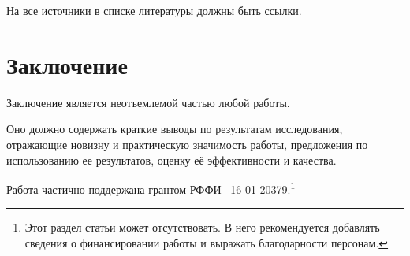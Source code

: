\documentclass[60x84/16,8pt]{ittmm}
\begin{document}
На все источники в списке литературы должны быть ссылки.

\section{Заключение}

Заключение является неотъемлемой частью любой работы. 

Оно должно содержать краткие выводы по результатам исследования,
отражающие новизну и практическую значимость работы, предложения по
использованию ее результатов, оценку её эффективности и качества.


\begin{acknowledgments}
  Работа частично поддержана грантом РФФИ
  \textnumero~16-01-20379.\footnote{Этот раздел статьи может
    отсутствовать.  В него рекомендуется добавлять сведения о
    финансировании работы и выражать благодарности персонам.}
\end{acknowledgments}














\makealttitle
\end{document}
